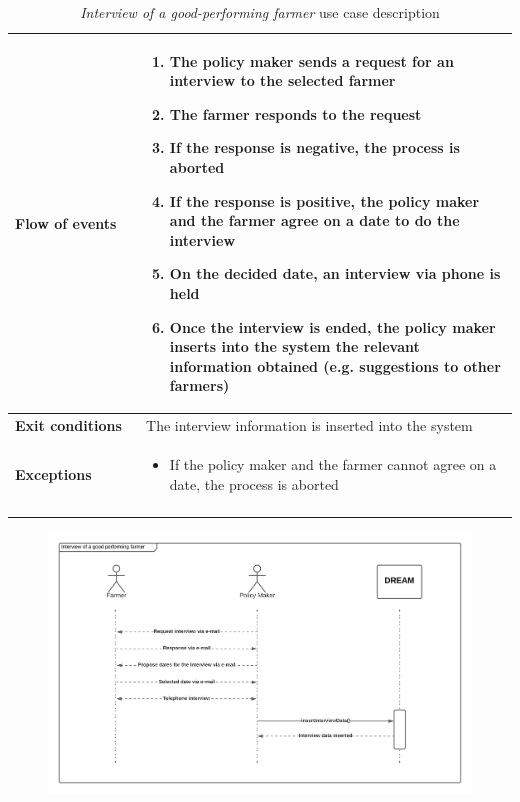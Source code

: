 \documentclass[10pt]{article}
\begin{document}
\begin{enumerate}[label=\textbf{UC\arabic*}]
\begin{longtable}{p{0.26\linewidth}p{0.75\linewidth}}
            \midrule
            \textbf{Flow of events} & 
            \begin{enumerate}
                \item The policy maker sends a request for an interview to the selected farmer
                \item The farmer responds to the request
                \item If the response is negative, the process is aborted
                \item If the response is positive, the policy maker and the farmer agree on a date to do the interview
                \item On the decided date, an interview via phone is held
                \item Once the interview is ended, the policy maker inserts into the system the relevant information obtained (e.g. suggestions to other farmers)
            \end{enumerate} \\
            \midrule
            \textbf{Exit conditions} & The interview information is inserted into the system\\
            \midrule
            \textbf{Exceptions} & 
            \begin{itemize}
                \item If the policy maker and the farmer cannot agree on a date, the process is aborted
            \end{itemize} \\
            \bottomrule
            \caption{\emph{Interview of a good-performing farmer} use case description}
        \end{longtable}
    \newpage
        \begin{figure}[ht!]
            \centering
            \includegraphics[scale=0.45]{sequence/interview.png}

\end{figure}
\end{enumerate}
\end{document}
